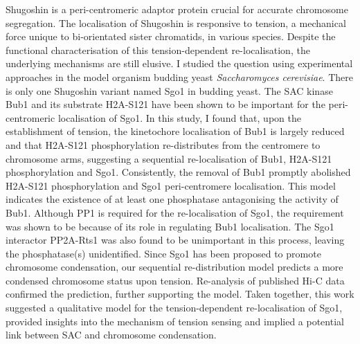 {Shugoshin is a peri-centromeric adaptor protein crucial for accurate chromosome segregation. The localisation of Shugoshin is responsive to tension, a mechanical force unique to bi-orientated sister chromatids, in various species. Despite the functional characterisation of this tension-dependent re-localisation, the underlying mechanisms are still elusive. I studied the question using experimental approaches in the model organism budding yeast \textit{Saccharomyces cerevisiae}. There is only one Shugoshin variant named Sgo1 in budding yeast. The SAC kinase Bub1 and its substrate H2A-S121 have been shown to be important for the peri-centromeric localisation of Sgo1. In this study, I found that, upon the establishment of tension, the kinetochore localisation of Bub1 is largely reduced and that H2A-S121 phosphorylation re-distributes from the centromere to chromosome arms, suggesting a sequential re-localisation of Bub1, H2A-S121 phosphorylation and Sgo1. Consistently, the removal of Bub1 promptly abolished H2A-S121 phosphorylation and Sgo1 peri-centromere localisation. This model indicates the existence of at least one phosphatase antagonising the activity of Bub1. Although PP1 is required for the re-localisation of Sgo1, the requirement was shown to be because of its role in regulating Bub1 localisation. The Sgo1 interactor PP2A-Rts1 was also found to be unimportant in this process, leaving the phosphatase(s) unidentified. Since Sgo1 has been proposed to promote chromosome condensation, our sequential re-distribution model predicts a more condensed chromosome status upon tension. Re-analysis of published Hi-C data confirmed the prediction, further supporting the model. Taken together, this work suggested a qualitative model for the tension-dependent re-localisation of Sgo1, provided insights into the mechanism of tension sensing and implied a potential link between SAC and chromosome condensation. 
}

